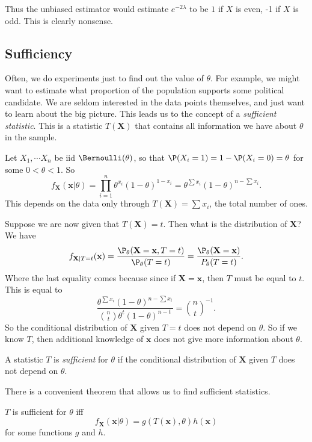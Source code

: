 \documentclass[a4paper]{article}
\begin{document}
Thus the unbiased estimator would estimate $e^{-2\lambda}$ to be $1$ if $X$ is even, -1 if $X$ is odd. This is clearly nonsense.
\subsection{Sufficiency}
Often, we do experiments just to find out the value of $\theta$. For example, we might want to estimate what proportion of the population supports some political candidate. We are seldom interested in the data points themselves, and just want to learn about the big picture. This leads us to the concept of a \emph{sufficient statistic}. This is a statistic $T(\mathbf{X})$ that contains all information we have about $\theta$ in the sample.

\begin{eg}
  Let $X_1, \cdots X_n$ be iid $\Bernoulli(\theta)$, so that $\P(X_i = 1) = 1 - \P(X_i = 0) = \theta$ for some $0 < \theta < 1$. So
  \[
    f_{\mathbf{X}} (\mathbf{x}|\theta) = \prod_{i = 1}^n \theta^{x_i}(1 - \theta)^{1 - x_i} = \theta^{\sum x_i}(1 - \theta)^{n - \sum x_i}.
  \]
  This depends on the data only through $T(\mathbf{X}) = \sum x_i$, the total number of ones.

  Suppose we are now given that $T(\mathbf{X}) = t$. Then what is the distribution of $\mathbf{X}$? We have
  \[
    f_{\mathbf{X}|T = t}(\mathbf{x}) = \frac{\P_\theta(\mathbf{X} = \mathbf{x}, T = t)}{\P_\theta (T = t)} = \frac{\P_\theta(\mathbf{X} = \mathbf{x})}{P_\theta(T = t)}.
  \]
  Where the last equality comes because since if $\mathbf{X} = \mathbf{x}$, then $T$ must be equal to $t$. This is equal to
  \[
    \frac{\theta^{\sum x_i}(1 - \theta)^{n - \sum x_i}}{\binom{n}{t}\theta^t (1 - \theta)^{n - t}} = \binom{n}{t}^{-1}.
  \]
  So the conditional distribution of $\mathbf{X}$ given $T = t$ does not depend on $\theta$. So if we know $T$, then additional knowledge of $\mathbf{x}$ does not give more information about $\theta$.
\end{eg}

\begin{defi}
  A statistic $T$ is \emph{sufficient} for $\theta$ if the conditional distribution of $\mathbf{X}$ given $T$ does not depend on $\theta$.
\end{defi}

There is a convenient theorem that allows us to find sufficient statistics.
\begin{thm}
  $T$ is sufficient for $\theta$ iff
  \[
    f_{\mathbf{X}}(\mathbf{x} |\theta) = g(T(\mathbf{x}), \theta)h(\mathbf{x})
  \]
  for some functions $g$ and $h$.
\end{thm}
\end{document}
